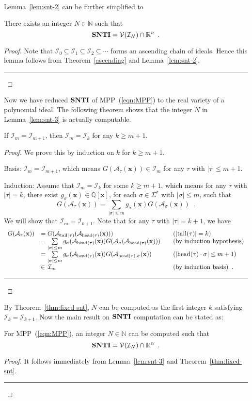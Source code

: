\documentclass{jssc}
\newcommand{\rulex}{\hfill\rule{1mm}{3mm}}
\newcommand{\head}{{\rm head}}
\newcommand{\tail}{{\rm tail}}
\newcommand{\A}{\mathcal{A}}
\newcommand{\I}{\mathcal{I}}
\newcommand{\V}{\mathcal{V}}
\newcommand{\xx}{\mathbf{x}}
\newcommand{\SNTI}{{\bf SNTI}}
\begin{document}
Lemma~\ref{lem:snt-2} can be further simplified to
\begin{lemma}\label{lem:snt-3}
There exists an integer $N \in \mathbb{N}$ such that
\[
\SNTI = \V(\I_N) \cap \mathbb{R}^n \enspace .
\]
\end{lemma}
\begin{proof}
Note that $\I_0 \subseteq \I_1 \subseteq \I_2 \subseteq \cdots$ forms an ascending chain of ideals. Hence this lemma follows from Theorem~\ref{ascending} and Lemma~\ref{lem:snt-2}. \rulex
\end{proof}

Now we have reduced $\SNTI$ of MPP~(\ref{eqn:MPP}) to the real variety of a polynomial ideal. The following theorem shows that the integer $N$ in Lemma~\ref{lem:snt-3} is actually computable.

\begin{theorem}\label{thm:fixed-snt}
If $\I_m=\I_{m+1}$, then $\I_m=\I_k$ for any $k \geq m+1$.
\end{theorem}
\begin{proof}
We prove this by induction on $k$ for $k \geq m+1$.

Basis: $\I_m=\I_{m+1}$, which means $G(\A_{\tau}(\xx)) \in \I_m$ for any $\tau$ with $|\tau| \leq m+1$.

Induction: Assume that $\I_m = \I_k$ for some $k \geq m+1$, which means for any $\tau$ with $|\tau|=k$, there exist $g_{\sigma}(\xx) \in \mathbb{Q}[\xx]$, for each $\sigma \in \Sigma^*$ with $|\sigma| \leq m$, such that
\[
G(\A_{\tau}(\xx))=\sum_{|\sigma| \leq m} g_{\sigma}(\xx) G(\A_{\sigma}(\xx)) \enspace .
\]
We will show that $\I_m = \I_{k+1}$. Note that for any $\tau$ with $|\tau|=k+1$, we have
\[
\begin{array}{lll}
G(\A_{\tau}(\xx)) & = G(\A_{\tail(\tau)}(\A_{\head(\tau)}(\xx))) & \quad(|\tail(\tau)|=k) \\
& = \sum\limits_{|\sigma|\leq m} g_{\sigma}(\A_{\head(\tau)}(\xx)) G(\A_{\sigma}(\A_{\head(\tau)}(\xx))) & \quad \mbox{(by induction hypothesis)} \\
& = \sum\limits_{|\sigma|\leq m} g_{\sigma}(\A_{\head(\tau)}(\xx)) G(\A_{\head(\tau)\cdot\sigma}(\xx)) & \quad (|\head(\tau) \cdot \sigma| \leq m+1) \\
& \in \,\I_m & \quad (\mbox{by induction basis}) \enspace .
\end{array}
\]
\rulex
\end{proof}

By Theorem~\ref{thm:fixed-snt}, $N$ can be computed as the first integer $k$ satisfying $\I_k=\I_{k+1}$. Now the main result on $\SNTI$ computation can be stated as:
\begin{theorem}\label{thm:main-snt}
For MPP~(\ref{eqn:MPP}), an integer $N \in \mathbb{N}$ can be computed such that
\[
\SNTI=\V(\I_N) \cap \mathbb{R}^n \enspace .
\]
\end{theorem}
\begin{proof}
It follows immediately from Lemma~\ref{lem:snt-3} and Theorem~\ref{thm:fixed-snt}. \rulex
\end{proof}
\end{document}
